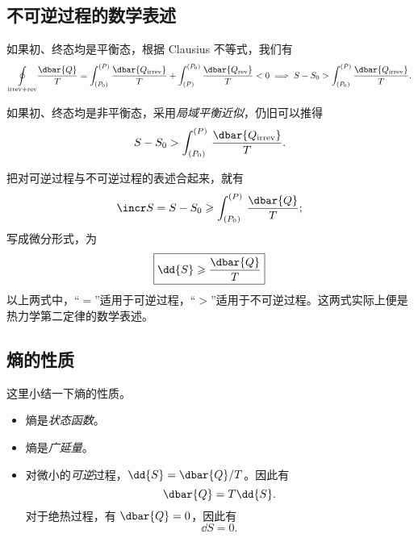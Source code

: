 \subsection{不可逆过程的数学表述}

如果初、终态均是平衡态，根据 Clausius 不等式，我们有
\begin{equation}
  \underset{\text{irrev}+\text{rev}}{\oint} \frac{\dbar{Q}}{T}
  = \int_{(P_0)}^{(P)} \frac{\dbar{Q_\text{irrev}}}{T}
    + \int_{(P)}^{(P_0)} \frac{\dbar{Q_\text{rev}}}{T} < 0
  \implies S - S_0 > \int_{(P_0)}^{(P)} \frac{\dbar{Q_\text{irrev}}}{T}.
\end{equation}

如果初、终态均是非平衡态，采用\emph{局域平衡近似}，仍旧可以推得
\begin{equation}
  S - S_0 > \int_{(P_0)}^{(P)} \, \frac{\dbar{Q_\text{irrev}}}{T}.
\end{equation} %

把对可逆过程与不可逆过程的表述合起来，就有
\begin{equation} \label{eq:secone-law-integral-form}
  \incr S = S - S_0 \geqslant \int_{(P_0)}^{(P)} \, \frac{\dbar{Q}}{T};
\end{equation}
写成微分形式，为
\begin{equation} \label{eq:secone-law-differential-form}
  \boxed{\dd{S} \geqslant \frac{\dbar{Q}}{T}}
\end{equation}
以上两式中，“$=$”适用于可逆过程，“$>$”适用于不可逆过程。这两式实际上便是热力学第二定律的数学表述。

\subsection{熵的性质}

这里小结一下熵的性质。

\begin{itemize}
  \item 熵是\emph{状态函数}。
  \item 熵是\emph{广延量}。
  \item 对微小的\emph{可逆}过程，$\dd{S} = \dbar{Q} / T$。因此有
  \begin{equation} \label{eq:dQ-TdS}
    \dbar{Q} = T \dd{S}.
  \end{equation}
  对于绝热过程，有 $\dbar{Q} = 0$，因此有
  \begin{equation} \label{eq:dS-for-adiabatic-reversible-process}
    \dd{S} = 0.
  \end{equation}
\end{itemize} %

